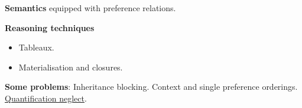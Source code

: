 \documentclass[12pt]{beamer}
\begin{document}
\begin{frame}
\begin{columns}
\begin{column}{0.55\textwidth}
{\vspace{-0.7em}
\textbf{Semantics} equipped with preference relations.

\textbf{Reasoning techniques}
\vspace{-0.7em}
\begin{itemize}
    \itemsep-0.3em
    \item Tableaux. %
    \item Materialisation and closures.
\end{itemize}

\textbf{Some problems}:
Inheritance blocking.
Context and single preference orderings.
\underline{Quantification neglect}.
}
    
\end{column}
\end{columns}
\end{frame}
\end{document}

